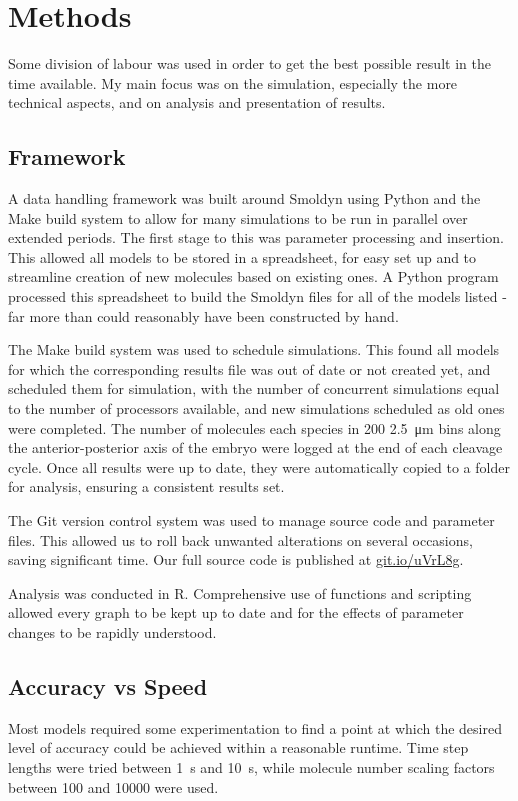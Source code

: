 \documentclass[11pt,a4paper,twocolumn]{article}
\begin{document}
\section{Methods}
Some division of labour was used in order to get the best possible result in the time available. My main focus was on the simulation, especially the more technical aspects, and on analysis and presentation of results.

\subsection{Framework}
A data handling framework was built around Smoldyn using Python and the Make build system to allow for many simulations to be run in parallel over extended periods. The first stage to this was parameter processing and insertion. This allowed all models to be stored in a spreadsheet, for easy set up and to streamline creation of new molecules based on existing ones. A Python program processed this spreadsheet to build the Smoldyn files for all of the models listed - far more than could reasonably have been constructed by hand. 

The Make build system was used to schedule simulations. This found all models for which the corresponding results file was out of date or not created yet, and scheduled them for simulation, with the number of concurrent simulations equal to the number of processors available, and new simulations scheduled as old ones were completed. The number of molecules each species in 200 \SI{2.5}{\micro\metre} bins along the anterior-posterior axis of the embryo were logged at the end of each cleavage cycle. Once all results were up to date, they were automatically copied to a folder for analysis, ensuring a consistent results set.

The Git version control system was used to manage source code and parameter files. This allowed us to roll back unwanted alterations on several occasions, saving significant time. Our full source code is published at \url{git.io/uVrL8g}.

Analysis was conducted in R. Comprehensive use of functions and scripting allowed every graph to be kept up to date and for the effects of parameter changes to be rapidly understood.

\subsection{Accuracy vs Speed}
Most models required some experimentation to find a point at which the desired level of accuracy could be achieved within a reasonable runtime. Time step lengths were tried between \SI{1}{s} and \SI{10}{s}, while molecule number scaling factors between \num{100} and \num{10000} were used. 
\end{document}
